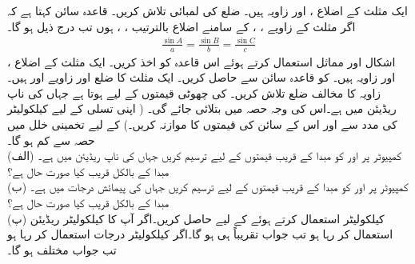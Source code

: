 \quad
ایک مثلث کے اضلاع ،  اور زاویہ  ہیں۔  ضلع  کی لمبائی تلاش کریں۔ 
\quad
قاعدہ سائن کہتا ہے کہ اگر مثلث کے زاویے ، ،  کے سامنے اضلاع بالترتیب ، ،  ہوں تب درج ذیل ہو گا۔
\begin{align*}
\tfrac{\sin A}{a}=\tfrac{\sin B}{b}=\tfrac{\sin C}{c}
\end{align*} 
اشکال  اور مماثل  استعمال کرتے ہوئے اس قاعدہ کو اخذ کریں۔
 \quad
ایک مثلث کے اضلاع ،  اور زاویہ  ہیں۔   کو قاعدہ سائن سے حاصل کریں۔
\quad
ایک مثلث کا ضلع  اور زاویے   اور  ہیں۔زاویہ  کا مخالف ضلع   تلاش کریں۔
   
\quad
{} کی چھوٹی قیمتوں کے لیے  ہوتا ہے جہاں  کی ناپ ریڈیئن میں ہے۔اس کی وجہ حصہ  میں بتلائی جائے گی۔  ( اپنی تسلی کے لیے کیلکولیٹر کی مدد سے    اور اس کے سائن کی قیمتوں کا موازنہ کریں۔)  کے لیے تخمینی خلل  میں  حصہ سے کم ہو گا۔\\
(الف)\quad
کمپیوٹر پر  اور  کو مبدا کے قریب قیمتوں کے لیے ترسیم کریں جہاں  کی ناپ ریڈیئن میں ہے۔مبدا کے بالکل قریب کیا صورت حال ہے؟\\
(ب)\quad
کمپیوٹر پر  اور  کو مبدا کے قریب قیمتوں کے لیے ترسیم کریں جہاں  کی پیمائش درجات میں ہے۔مبدا کے بالکل قریب کیا صورت حال ہے؟\\
(پ)\quad
کیلکولیٹر استعمال کرتے ہوئے  کے لیے  حاصل کریں۔اگر آپ کا کیلکولیٹر ریڈیئن استعمال کر رہا ہو تب جواب تقریباً  ہی ہو گا۔اگر کیلکولیٹر درجات استعمال کر رہا ہو تب جواب مختلف ہو گا۔

